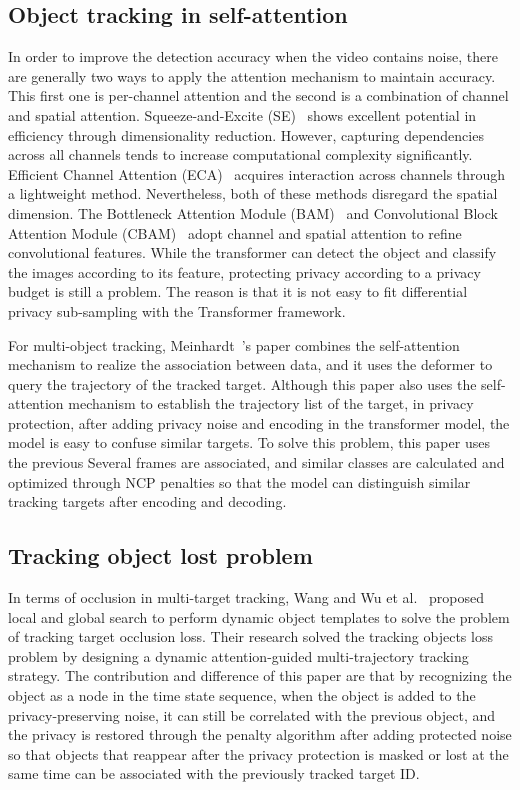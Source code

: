 \documentclass[trans]{IEEEtran}
\begin{document}
\subsection{Object tracking in self-attention}
In order to improve the detection accuracy when the video contains noise, there are generally two ways to apply the attention mechanism to maintain accuracy.
This first one is per-channel attention and the second is a combination of channel and spatial attention.
Squeeze-and-Excite (SE)~\cite{hu2018squeeze} shows excellent potential in efficiency through dimensionality reduction. However, capturing dependencies across all channels tends to increase computational complexity significantly. 
Efficient Channel Attention (ECA)~\cite{qilong2020eca} acquires interaction across channels through a lightweight method. 
Nevertheless, both of these methods disregard the spatial dimension. 
The Bottleneck Attention Module (BAM)~\cite{park2018bam} and Convolutional Block Attention Module (CBAM)~\cite{woo2018cbam} adopt channel and spatial attention to refine convolutional features. 
While the transformer can detect the object and classify the images according to its feature, protecting privacy according to a privacy budget is still a problem. The reason is that it is not easy to fit differential privacy sub-sampling with the Transformer framework.

For multi-object tracking, Meinhardt~\cite{meinhardt2022trackformer}'s paper combines the self-attention mechanism to realize the association between data, and it uses the deformer to query the trajectory of the tracked target. Although this paper also uses the self-attention mechanism to establish the trajectory list of the target, in privacy protection, after adding privacy noise and encoding in the transformer model, the model is easy to confuse similar targets. To solve this problem, this paper uses the previous Several frames are associated, and similar classes are calculated and optimized through NCP penalties so that the model can distinguish similar tracking targets after encoding and decoding.

\subsection{Tracking object lost problem}
In terms of occlusion in multi-target tracking, Wang and Wu et al.~\cite{wang2021dynamic} proposed local and global search to perform dynamic object templates to solve the problem of tracking target occlusion loss. Their research solved the tracking objects loss problem by designing a dynamic attention-guided multi-trajectory tracking strategy. The contribution and difference of this paper are that by recognizing the object as a node in the time state sequence, when the object is added to the privacy-preserving noise, it can still be correlated with the previous object, and the privacy is restored through the penalty algorithm after adding protected noise so that objects that reappear after the privacy protection is masked or lost at the same time can be associated with the previously tracked target ID.
\end{document}
